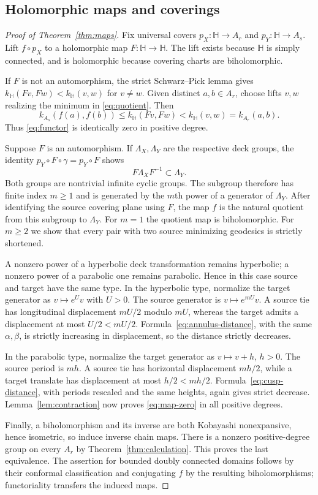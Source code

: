 \documentclass[12pt]{amsart}
\theoremstyle{definition}
\theoremstyle{remark}
\numberwithin{equation}{section}
\begin{document}
\subsection{Holomorphic maps and coverings}
\begin{proof}[Proof of Theorem~\ref{thm:maps}]
Fix universal covers $p_X:\mathbb H\to A_r$ and $p_Y:\mathbb H\to A_s$. Lift $f\circ p_X$ to a holomorphic map $F:\mathbb H\to\mathbb H$. The lift exists because $\mathbb H$ is simply connected, and is holomorphic because covering charts are biholomorphic.

If $F$ is not an automorphism, the strict Schwarz--Pick lemma \cite[Theorem 3.2]{BM} gives $k_{\mathbb H}(Fv,Fw)<k_{\mathbb H}(v,w)$ for $v\ne w$. Given distinct $a,b\in A_r$, choose lifts $v,w$ realizing the minimum in \eqref{eq:quotient}. Then
\[
 k_{A_s}(f(a),f(b))\le k_{\mathbb H}(Fv,Fw)
 <k_{\mathbb H}(v,w)=k_{A_r}(a,b).
\]
Thus \eqref{eq:functor} is identically zero in positive degree.

Suppose $F$ is an automorphism. If $\Lambda_X,\Lambda_Y$ are the respective deck groups, the identity $p_Y\circ F\circ\gamma=p_Y\circ F$ shows
\[
 F\Lambda_XF^{-1}\subset\Lambda_Y.
\]
Both groups are nontrivial infinite cyclic groups. The subgroup therefore has finite index $m\ge1$ and is generated by the $m$th power of a generator of $\Lambda_Y$. After identifying the source covering plane using $F$, the map $f$ is the natural quotient from this subgroup to $\Lambda_Y$. For $m=1$ the quotient map is biholomorphic. For $m\ge2$ we show that every pair with two source minimizing geodesics is strictly shortened.

A nonzero power of a hyperbolic deck transformation remains hyperbolic; a nonzero power of a parabolic one remains parabolic. Hence in this case source and target have the same type. In the hyperbolic type, normalize the target generator as $v\mapsto e^U v$ with $U>0$. The source generator is $v\mapsto e^{mU}v$. A source tie has longitudinal displacement $mU/2$ modulo $mU$, whereas the target admits a displacement at most $U/2<mU/2$. Formula~\eqref{eq:annulus-distance}, with the same $\alpha,\beta$, is strictly increasing in displacement, so the distance strictly decreases.

In the parabolic type, normalize the target generator as $v\mapsto v+h$, $h>0$. The source period is $mh$. A source tie has horizontal displacement $mh/2$, while a target translate has displacement at most $h/2<mh/2$. Formula~\eqref{eq:cusp-distance}, with periods rescaled and the same heights, again gives strict decrease. Lemma~\ref{lem:contraction} now proves \eqref{eq:map-zero} in all positive degrees.

Finally, a biholomorphism and its inverse are both Kobayashi nonexpansive, hence isometric, so induce inverse chain maps. There is a nonzero positive-degree group on every $A_r$ by Theorem~\ref{thm:calculation}. This proves the last equivalence. The assertion for bounded doubly connected domains follows by their conformal classification and conjugating $f$ by the resulting biholomorphisms; functoriality transfers the induced maps.
\end{proof}
\end{document}

